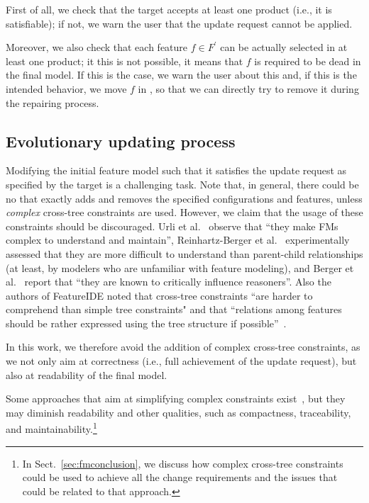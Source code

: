 \begin{tikzborder}{\cite{Gargantini16:validation}}
\begin{tikzborder}{\cite{gargantini_combinatorial_2017}}
\begin{tikzborder}{\cite{gargantini_combinatorial_2017}}
\begin{tikzborder}{\cite{garn2019}}
\begin{tikzborder}{\cite{arcaini2019achieving}}
	First of all, we check that the target accepts at least one product (i.e., it is satisfiable); if not, we warn the user that the update request cannot be applied.
	
	Moreover, we also check that each feature $f \in F^\prime$ can be actually selected in at least one product; it this is not possible, it means that $f$ is required to be dead in the final model. If this is the case, we warn the user about this and, if this is the intended behavior, we move $f$ in \Frem, so that we can directly try to remove it during the repairing process.\be
	
	\subsection{Evolutionary updating process}\label{sec:process}
	
	\bb Modifying the initial feature model \initFm such that it satisfies the update request as specified by the target is a challenging task. Note that, in general, there could be no \fmp that exactly adds and removes the specified configurations and features, unless {\it complex} cross-tree constraints are used. However, we claim that the usage of these constraints should be discouraged. Urli et al.~\cite{visualSupport} observe that ``they make FMs complex to understand and maintain'', Reinhartz-Berger et al.~\cite{ComprehendingFeatureModels} experimentally assessed that they are more difficult to understand than parent-child relationships (at least, by modelers who are unfamiliar with feature modeling), and Berger et al.~\cite{Berger2013} report that ``they are known to critically influence reasoners''. Also the authors of FeatureIDE noted that cross-tree constraints ``are harder to comprehend than simple tree constraints" and that ``relations among features should be rather expressed using the tree structure if possible''~\cite{FeatureIDEbook}. 
	\be
	
	In this work, we therefore avoid the addition of complex cross-tree constraints, as we not only aim at correctness (i.e., full achievement of the update request), but also at readability of the final model.
	
	Some approaches that aim at simplifying complex constraints exist~\cite{knuppel_is_2017,vonRhein2015}, but they may diminish readability and other qualities, such as compactness, traceability, and maintainability.\footnote{In Sect.~\ref{sec:fmconclusion}, we discuss how complex cross-tree constraints could be used to achieve all the change requirements and the issues that could be related to that approach.}
	

\end{tikzborder}
\end{tikzborder}
\end{tikzborder}
\end{tikzborder}
\end{tikzborder}
